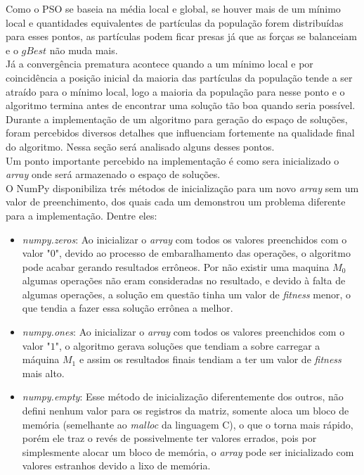 Como o PSO se baseia na média local e global, se houver mais de um mínimo local e quantidades equivalentes de partículas da população forem distribuídas para esses pontos, as partículas podem ficar presas já que as forças se balanceiam e o $gBest$ não muda mais.\\
%
\indent Já a convergência prematura acontece quando a um mínimo local e por coincidência a posição inicial da maioria das partículas da população tende a ser atraído para o mínimo local, logo a maioria da população para nesse ponto e o algoritmo termina antes de encontrar uma solução tão boa quando seria possível.\\
\indent Durante a implementação de um algoritmo para geração do espaço de soluções, foram percebidos diversos detalhes que influenciam fortemente na qualidade final do algoritmo. Nessa seção será analisado alguns desses pontos.\\
\indent Um ponto importante percebido na implementação é como sera inicializado o \textit{array} onde será armazenado o espaço de soluções.\\
\indent O NumPy disponibiliza trés métodos de inicialização para um novo \textit{array} sem um valor de preenchimento, dos quais cada um demonstrou um problema diferente para a implementação. Dentre eles: 
\begin{itemize}
    \item \textit{numpy.zeros}: Ao inicializar o \textit{array} com todos os valores preenchidos com o valor "$0$", devido ao processo de embaralhamento das operações, o algoritmo pode acabar gerando resultados errôneos. Por não existir uma maquina $M_0$ algumas operações não eram consideradas no resultado, e devido à falta de algumas operações, a solução em questão tinha um valor de \textit{fitness} menor, o que tendia a fazer essa solução errônea a melhor.

    \item \textit{numpy.ones}: Ao inicializar o \textit{array} com todos os valores preenchidos com o valor "$1$", o algoritmo gerava soluções que tendiam a sobre carregar a máquina $M_1$ e assim os resultados finais tendiam a ter um valor de \textit{fitness} mais alto.

    \item \textit{numpy.empty}: Esse método de inicialização diferentemente dos outros, não defini nenhum valor para os registros da matriz, somente aloca um bloco de memória (semelhante ao \textit{malloc} da linguagem C), o que o torna mais rápido, porém ele traz o revés de possivelmente ter valores errados, pois por simplesmente alocar um bloco de memória, o \textit{array} pode ser inicializado com valores estranhos devido a lixo de memória.
\end{itemize}

